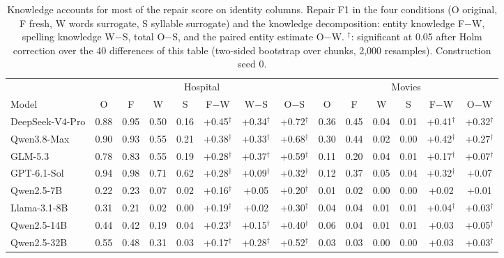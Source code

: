 \begin{table}[t]
  \caption{Knowledge accounts for most of the repair score on identity columns. Repair F1 in the four conditions
  (O original, F fresh, W words surrogate, S syllable
  surrogate) and the knowledge decomposition: entity knowledge F$-$W, spelling knowledge W$-$S, total O$-$S, and the
  paired entity estimate O$-$W. $^\dagger$: significant at 0.05 after Holm correction over the 40 differences of
  this table (two-sided bootstrap over chunks, 2,000 resamples). Construction seed 0.}
  \label{tab:main}
  \small
  \begin{tabular*}{\textwidth}{@{\extracolsep{\fill}}l cccc ccc cccc cc@{}}
    \toprule
    & \multicolumn{7}{c}{Hospital} & \multicolumn{6}{c}{Movies} \\
    \cmidrule(lr){2-8}\cmidrule(l){9-14}
    Model & O & F & W & S & F$-$W & W$-$S & O$-$S & O & F & W & S & F$-$W & O$-$W \\
    \midrule
    DeepSeek-V4-Pro & 0.88 & 0.95 & 0.50 & 0.16 & +0.45$^\dagger$ & +0.34$^\dagger$ & +0.72$^\dagger$ & 0.36 & 0.45 & 0.04 & 0.01 & +0.41$^\dagger$ & +0.32$^\dagger$ \\
    Qwen3.8-Max & 0.90 & 0.93 & 0.55 & 0.21 & +0.38$^\dagger$ & +0.33$^\dagger$ & +0.68$^\dagger$ & 0.30 & 0.44 & 0.02 & 0.00 & +0.42$^\dagger$ & +0.27$^\dagger$ \\
    GLM-5.3 & 0.78 & 0.83 & 0.55 & 0.19 & +0.28$^\dagger$ & +0.37$^\dagger$ & +0.59$^\dagger$ & 0.11 & 0.20 & 0.04 & 0.01 & +0.17$^\dagger$ & +0.07$^\dagger$ \\
    GPT-6.1-Sol & 0.94 & 0.98 & 0.71 & 0.62 & +0.28$^\dagger$ & +0.09$^\dagger$ & +0.32$^\dagger$ & 0.12 & 0.37 & 0.05 & 0.04 & +0.32$^\dagger$ & +0.07 \\
    \midrule
    Qwen2.5-7B & 0.22 & 0.23 & 0.07 & 0.02 & +0.16$^\dagger$ & +0.05 & +0.20$^\dagger$ & 0.01 & 0.02 & 0.00 & 0.00 & +0.02 & +0.01 \\
    Llama-3.1-8B & 0.31 & 0.21 & 0.02 & 0.00 & +0.19$^\dagger$ & +0.02 & +0.30$^\dagger$ & 0.04 & 0.04 & 0.01 & 0.01 & +0.04$^\dagger$ & +0.03$^\dagger$ \\
    Qwen2.5-14B & 0.44 & 0.42 & 0.19 & 0.04 & +0.23$^\dagger$ & +0.15$^\dagger$ & +0.40$^\dagger$ & 0.06 & 0.04 & 0.01 & 0.01 & +0.03 & +0.05$^\dagger$ \\
    Qwen2.5-32B & 0.55 & 0.48 & 0.31 & 0.03 & +0.17$^\dagger$ & +0.28$^\dagger$ & +0.52$^\dagger$ & 0.03 & 0.03 & 0.00 & 0.00 & +0.03 & +0.03$^\dagger$ \\
    \bottomrule
  \end{tabular*}
\end{table}
